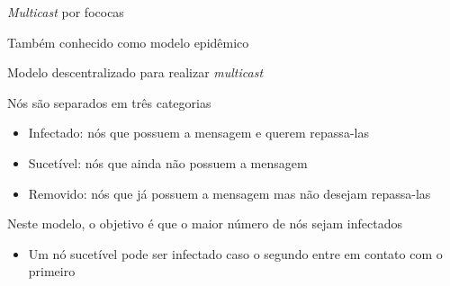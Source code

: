 \documentclass[compress]{beamer}
\begin{document}

\begin{frame}{\textit{Multicast} por fococas}

Também conhecido como modelo epidêmico

\vspace{0.3cm}

Modelo descentralizado para realizar \textit{multicast}

\vspace{0.3cm}

Nós são separados em três categorias
\begin{itemize}
    \item Infectado: nós que possuem a mensagem e querem repassa-las
    \item Sucetível: nós que ainda não possuem a mensagem
    \item Removido: nós que já possuem a mensagem mas não desejam repassa-las
\end{itemize}

\vspace{0.3cm}

Neste modelo, o objetivo é que o maior número de nós sejam infectados
\begin{itemize}
    \item Um nó sucetível pode ser infectado caso o segundo entre em contato com o primeiro
\end{itemize}
\end{frame}
\end{document}
